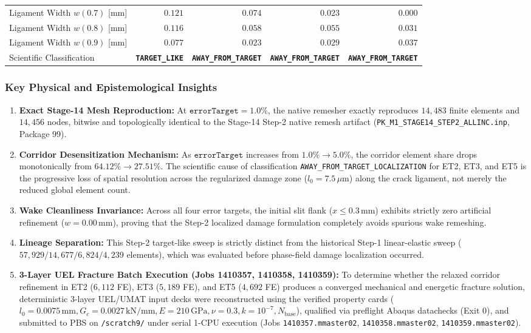 \begin{table}[htbp]
\begin{tabular}{lrrrr}
Ligament Width $w(0.7)$ [mm] & $0.121$ & $0.074$ & $0.023$ & $0.000$ \\
Ligament Width $w(0.8)$ [mm] & $0.116$ & $0.058$ & $0.055$ & $0.031$ \\
Ligament Width $w(0.9)$ [mm] & $0.077$ & $0.023$ & $0.029$ & $0.037$ \\
Scientific Classification & \textbf{\texttt{TARGET\_LIKE}} & \textbf{\texttt{AWAY\_FROM\_TARGET}} & \textbf{\texttt{AWAY\_FROM\_TARGET}} & \textbf{\texttt{AWAY\_FROM\_TARGET}} \\
\bottomrule
\end{tabular}
\end{table}

\subsubsection{Key Physical and Epistemological Insights}
\begin{enumerate}
  \item \textbf{Exact Stage-14 Mesh Reproduction:} At $\texttt{errorTarget} = 1.0\%$, the native remesher exactly reproduces $14{,}483$ finite elements and $14{,}456$ nodes, bitwise and topologically identical to the Stage-14 Step-2 native remesh artifact (\texttt{PK\_M1\_STAGE14\_STEP2\_ALLINC.inp}, Package 99).
  \item \textbf{Corridor Desensitization Mechanism:} As $\texttt{errorTarget}$ increases from $1.0\% \to 5.0\%$, the corridor element share drops monotonically from $64.12\% \to 27.51\%$. The scientific cause of classification \texttt{AWAY\_FROM\_TARGET\_LOCALIZATION} for ET2, ET3, and ET5 is the progressive loss of spatial resolution across the regularized damage zone ($l_0 = 7.5\,\mu\mathrm{m}$) along the crack ligament, not merely the reduced global element count.
  \item \textbf{Wake Cleanliness Invariance:} Across all four error targets, the initial slit flank ($x \le 0.3\,\mathrm{mm}$) exhibits strictly zero artificial refinement ($w = 0.00\,\mathrm{mm}$), proving that the Step-2 localized damage formulation completely avoids spurious wake remeshing.
  \item \textbf{Lineage Separation:} This Step-2 target-like sweep is strictly distinct from the historical Step-1 linear-elastic sweep ($57{,}929 / 14{,}677 / 6{,}824 / 4{,}239$ elements), which was evaluated before phase-field damage localization occurred.
  \item \textbf{3-Layer UEL Fracture Batch Execution (Jobs 1410357, 1410358, 1410359):} To determine whether the relaxed corridor refinement in ET2 ($6{,}112$ FE), ET3 ($5{,}189$ FE), and ET5 ($4{,}692$ FE) produces a converged mechanical and energetic fracture solution, deterministic 3-layer UEL/UMAT input decks were reconstructed using the verified property cards ($l_0=0.0075\,\mathrm{mm}, G_c=0.0027\,\mathrm{kN/mm}, E=210\,\mathrm{GPa}, \nu=0.3, k=10^{-7}, N_{\mathrm{base}}$), qualified via preflight Abaqus datachecks (Exit 0), and submitted to PBS on \texttt{/scratch9/} under serial 1-CPU execution (Jobs \texttt{1410357.mmaster02}, \texttt{1410358.mmaster02}, \texttt{1410359.mmaster02}).
\end{enumerate}
